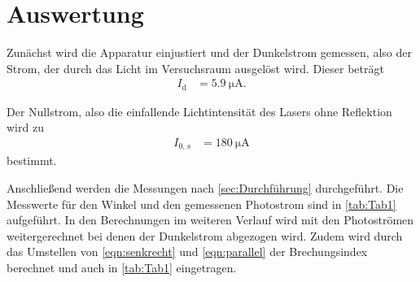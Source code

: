 \section{Auswertung}
\label{sec:Auswertung}

Zunächst wird die Apparatur einjustiert und der Dunkelstrom gemessen, also der Strom, der durch das Licht im Versuchsraum ausgelöst wird.
Dieser beträgt
\begin{align*}
  I_{\text{d}}&=\qty{5.9}{\micro\ampere}.
\end{align*}

Der Nullstrom, also die einfallende Lichtintensität des Lasers ohne Reflektion wird zu
\begin{align*}
  I_{\text{0, s}}&=\qty{180}{\micro\ampere}
\end{align*}
bestimmt.

Anschließend werden die Messungen nach \autoref{sec:Durchführung} durchgeführt.
Die Messwerte für den Winkel und den gemessenen Photostrom sind in \autoref{tab:Tab1} aufgeführt.
In den Berechnungen im weiteren Verlauf wird mit den Photoströmen weitergerechnet bei denen der Dunkelstrom abgezogen wird.
Zudem wird durch das Umstellen von \autoref{eqn:senkrecht} und \autoref{eqn:parallel} der Brechungsindex berechnet und auch in \autoref{tab:Tab1} eingetragen.

